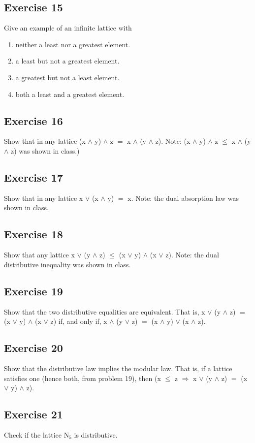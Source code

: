 \documentclass{article}
\newcommand{\mt}[1]{\ensuremath{#1}}
\newcommand\ssc[2][\DefaultOpt]{%
  \def\DefaultOpt{#2}%
  \subsection[#1]{#2}%
}
\newcommand{\balist}{\begin{enumerate}[label=\alph*.]}
\newcommand{\elist}{\end{enumerate}}
\newcommand{\rar}{ \mt{\Rightarrow} }     %
\newcommand{\lse}{\mt{\leq} }
\newcommand{\eql}{\mt{=} }
\newcommand{\uw}[2]{#1\mt{_{#2}}}
\newcommand{\lgnd}{\mt{\land} }
\newcommand{\lgor}{\mt{\lor} }
\begin{document}
\ssc{Exercise 15}{

Give an example of an infinite lattice with 

\balist
\item neither a least nor a greatest element.
\item a least but not a greatest element.
\item a greatest but not a least element.
\item both a least and a greatest element.
\elist

}

\ssc{Exercise 16}{

Show that in any lattice (x \lgnd y) \lgnd z \eql x \lgnd (y \lgnd z). Note: (x \lgnd y) \lgnd z \lse x \lgnd (y \lgnd z) was shown in class.)

}

\ssc{Exercise 17}{

Show that in any lattice x \lgor (x \lgnd y) \eql x. Note: the dual absorption law was shown in class.

}

\ssc{Exercise 18}{

Show that any lattice x \lgor (y \lgnd z) \lse (x \lgor y) \lgnd (x \lgor z). Note: the dual distributive inequality was shown in class.

}

\ssc{Exercise 19}{

Show that the two distributive equalities are equivalent. That is, x \lgor (y \lgnd z) \eql (x \lgor y) \lgnd (x \lgor z) if, and only if, x \lgnd (y \lgor z) \eql (x \lgnd y) \lgor (x \lgnd z).

}

\ssc{Exercise 20}{

Show that the distributive law implies the modular law. That is, if a lattice satisfies one (hence both, from problem 19), then (x \lse z \rar x \lgor (y \lgnd z) \eql (x \lgor y) \lgnd z).

}

\ssc{Exercise 21}{

Check if the lattice \uw{N}{5} is distributive.

}
\end{document}
